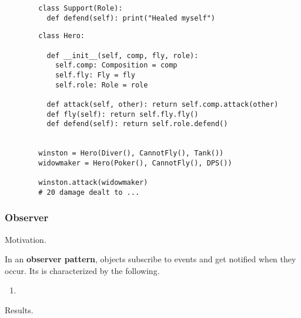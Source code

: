 \begin{example}[Overwatch]
\begin{lstlisting}
        class Support(Role): 
          def defend(self): print("Healed myself")
      \end{lstlisting} 

      \begin{lstlisting}
        class Hero: 

          def __init__(self, comp, fly, role): 
            self.comp: Composition = comp 
            self.fly: Fly = fly 
            self.role: Role = role 

          def attack(self, other): return self.comp.attack(other)
          def fly(self): return self.fly.fly() 
          def defend(self): return self.role.defend()


        winston = Hero(Diver(), CannotFly(), Tank()) 
        widowmaker = Hero(Poker(), CannotFly(), DPS()) 

        winston.attack(widowmaker) 
        # 20 damage dealt to ...
      \end{lstlisting}
    \end{example}

  \subsubsection{Observer} 

    Motivation. 

    \begin{definition}
      In an \textbf{observer pattern}, objects subscribe to events and get notified when they occur. Its is characterized by the following. 
      \begin{enumerate}
        \item 
      \end{enumerate}
    \end{definition}

    Results. 

